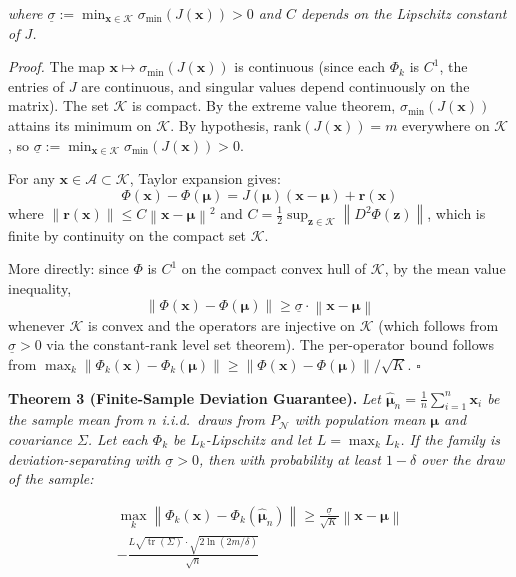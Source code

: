\documentclass[journal]{IEEEtran}
\newcommand{\norm}[1]{\left\lVert#1\right\rVert}
\DeclareMathOperator{\tr}{tr}
\begin{document}
\textit{where $\underline{\sigma} := \min_{\mathbf{x} \in \mathcal{K}} \sigma_{\min}(J(\mathbf{x})) > 0$ and $C$ depends on the Lipschitz constant of $J$.}

\textit{Proof.} The map $\mathbf{x} \mapsto \sigma_{\min}(J(\mathbf{x}))$ is continuous (since each $\Phi_k$ is $C^1$, the entries of $J$ are continuous, and singular values depend continuously on the matrix). The set $\mathcal{K}$ is compact. By the extreme value theorem, $\sigma_{\min}(J(\mathbf{x}))$ attains its minimum on $\mathcal{K}$. By hypothesis, $\text{rank}(J(\mathbf{x})) = m$ everywhere on $\mathcal{K}$, so $\underline{\sigma} := \min_{\mathbf{x} \in \mathcal{K}} \sigma_{\min}(J(\mathbf{x})) > 0$.

For any $\mathbf{x} \in \mathcal{A} \subset \mathcal{K}$, Taylor expansion gives:
$$\Phi(\mathbf{x}) - \Phi(\boldsymbol{\mu}) = J(\boldsymbol{\mu})(\mathbf{x} - \boldsymbol{\mu}) + \mathbf{r}(\mathbf{x})$$
where $\norm{\mathbf{r}(\mathbf{x})} \leq C \norm{\mathbf{x} - \boldsymbol{\mu}}^2$ and $C = \frac{1}{2}\sup_{\mathbf{z} \in \mathcal{K}} \norm{D^2 \Phi(\mathbf{z})}$, which is finite by continuity on the compact set $\mathcal{K}$.

More directly: since $\Phi$ is $C^1$ on the compact convex hull of $\mathcal{K}$, by the mean value inequality,
$$\norm{\Phi(\mathbf{x}) - \Phi(\boldsymbol{\mu})} \geq \underline{\sigma} \cdot \norm{\mathbf{x} - \boldsymbol{\mu}}$$
whenever $\mathcal{K}$ is convex and the operators are injective on $\mathcal{K}$ (which follows from $\underline{\sigma} > 0$ via the constant-rank level set theorem). The per-operator bound follows from $\max_k \norm{\Phi_k(\mathbf{x}) - \Phi_k(\boldsymbol{\mu})} \geq \norm{\Phi(\mathbf{x}) - \Phi(\boldsymbol{\mu})}/\sqrt{K}$. $\square$

\vspace{0.5em}

\textbf{Theorem 3 (Finite-Sample Deviation Guarantee).} \textit{Let $\hat{\boldsymbol{\mu}}_n = \frac{1}{n}\sum_{i=1}^n \mathbf{x}_i$ be the sample mean from $n$ i.i.d.\ draws from $P_{\mathcal{N}}$ with population mean $\boldsymbol{\mu}$ and covariance $\Sigma$. Let each $\Phi_k$ be $L_k$-Lipschitz and let $L = \max_k L_k$. If the family is deviation-separating with $\underline{\sigma} > 0$, then with probability at least $1 - \delta$ over the draw of the sample:}

\begin{multline}
\max_{k} \norm{\Phi_k(\mathbf{x}) - \Phi_k(\hat{\boldsymbol{\mu}}_n)} \geq
  \frac{\underline{\sigma}}{\sqrt{K}} \norm{\mathbf{x} - \boldsymbol{\mu}} \\
  - \frac{L \sqrt{\tr(\Sigma)} \cdot \sqrt{2 \ln(2m/\delta)}}{\sqrt{n}}
\label{eq:finite_sample}
\end{multline}
\end{document}
